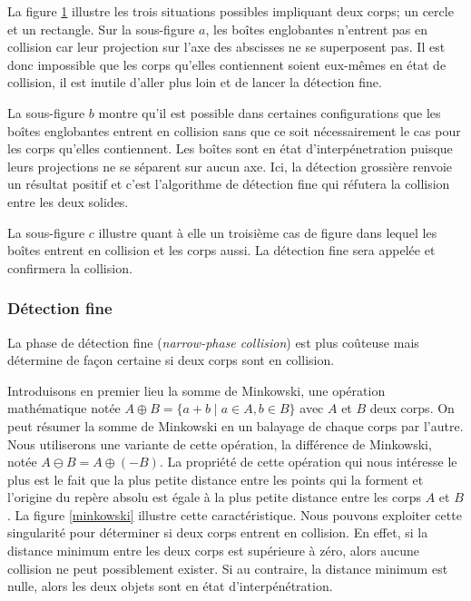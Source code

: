 La figure \ref{aabb} illustre les trois situations possibles
impliquant deux corps; un cercle et un rectangle. Sur la sous-figure
$a$, les boîtes englobantes n'entrent pas en collision car leur
projection sur l'axe des abscisses ne se superposent pas. Il est donc
impossible que les corps qu'elles contiennent soient eux-mêmes en état
de collision, il est inutile d'aller plus loin et de lancer la
détection fine.

La sous-figure $b$ montre qu'il est possible dans certaines
configurations que les boîtes englobantes entrent en collision sans
que ce soit nécessairement le cas pour les corps qu'elles
contiennent. Les boîtes sont en état d'interpénetration puisque leurs
projections ne se séparent sur aucun axe. Ici, la détection grossière
renvoie un résultat positif et c'est l'algorithme de détection fine
qui réfutera la collision entre les deux solides.

La sous-figure $c$ illustre quant à elle un troisième cas de figure
dans lequel les boîtes entrent en collision et les corps aussi. La
détection fine sera appelée et confirmera la collision.

\begin{figure}
  \centering
  \qquad
  \qquad
  \caption{}
  \label{aabb}
\end{figure}

\subsubsection{Détection fine}

La phase de détection fine (\textit{narrow-phase collision}) est plus
coûteuse mais détermine de façon certaine si deux corps sont en
collision.

Introduisons en premier lieu la somme de Minkowski, une opération
mathématique notée $A \oplus B = \{a + b \mid a \in A, b \in B\}$ avec
$A$ et $B$ deux corps. On peut résumer la somme de Minkowski en un
balayage de chaque corps par l'autre. Nous utiliserons une variante de
cette opération, la différence de Minkowski, notée $A \ominus B = A
\oplus (-B)$. La propriété de cette opération qui nous intéresse le
plus est le fait que la plus petite distance entre les points qui la
forment et l'origine du repère absolu est égale à la plus petite
distance entre les corps $A$ et $B$. La figure \ref{minkowski}
illustre cette caractéristique. Nous pouvons exploiter cette
singularité pour déterminer si deux corps entrent en collision. En
effet, si la distance minimum entre les deux corps est supérieure à
zéro, alors aucune collision ne peut possiblement exister. Si au
contraire, la distance minimum est nulle, alors les deux objets sont
en état d'interpénétration.


